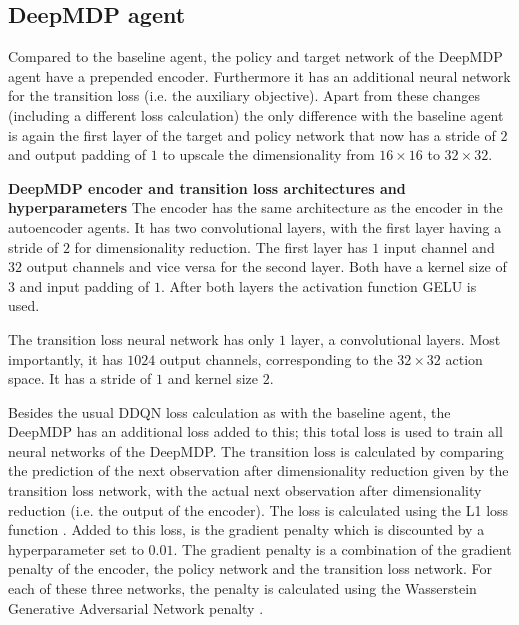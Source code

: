 \subsection{DeepMDP agent}
Compared to the baseline agent, the policy and target network of the DeepMDP agent have a prepended encoder. Furthermore it has an additional neural network for the transition loss (i.e. the auxiliary objective). Apart from these changes (including a different loss calculation) the only difference with the baseline agent is again the first layer of the target and policy network that now has a stride of $2$ and output padding of $1$ to upscale the dimensionality from $16 \times 16$ to $32 \times 32$. \newline

\noindent \textbf{DeepMDP encoder and transition loss architectures and hyperparameters} \newline
\noindent The encoder has the same architecture as the encoder in the autoencoder agents. It has two convolutional layers, with the first layer having a stride of $2$ for dimensionality reduction. The first layer has $1$ input channel and $32$ output channels and vice versa for the second layer. Both have a kernel size of $3$ and input padding of $1$. After both layers the activation function GELU is used.

The transition loss neural network has only $1$ layer, a convolutional layers. Most importantly, it has $1024$ output channels, corresponding to the $32 \times 32$ action space. It has a stride of $1$ and kernel size $2$.

Besides the usual DDQN loss calculation as with the baseline agent, the DeepMDP has an additional loss added to this; this total loss is used to train all neural networks of the DeepMDP. The transition loss is calculated by comparing the prediction of the next observation after dimensionality reduction given by the transition loss network, with the actual next observation after dimensionality reduction (i.e. the output of the encoder). The loss is calculated using the L1 loss function \cite{l1}. Added to this loss, is the gradient penalty which is discounted by a hyperparameter set to $0.01$. The gradient penalty is a combination of the gradient penalty of the encoder, the policy network and the transition loss network. For each of these three networks, the penalty is calculated using the Wasserstein Generative Adversarial Network penalty \cite{wgan}.

